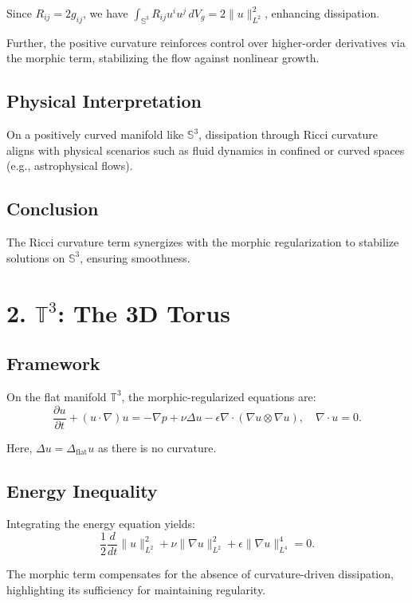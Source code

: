 \documentclass[12pt]{article}
\begin{document}
Since \( R_{ij} = 2g_{ij} \), we have \( \int_{\mathbb{S}^3} R_{ij} u^i u^j \, dV_g = 2 \| u \|_{L^2}^2 \), enhancing dissipation.

Further, the positive curvature reinforces control over higher-order derivatives via the morphic term, stabilizing the flow against nonlinear growth.

\subsection*{Physical Interpretation}
On a positively curved manifold like \( \mathbb{S}^3 \), dissipation through Ricci curvature aligns with physical scenarios such as fluid dynamics in confined or curved spaces (e.g., astrophysical flows).

\subsection*{Conclusion}
The Ricci curvature term synergizes with the morphic regularization to stabilize solutions on \( \mathbb{S}^3 \), ensuring smoothness.

\section*{2. \( \mathbb{T}^3 \): The 3D Torus}

\subsection*{Framework}
On the flat manifold \( \mathbb{T}^3 \), the morphic-regularized equations are:
\begin{equation}
\frac{\partial u}{\partial t} + (u \cdot \nabla)u = -\nabla p + \nu \Delta u - \epsilon \nabla \cdot (\nabla u \otimes \nabla u), \quad \nabla \cdot u = 0.
\end{equation}

Here, \( \Delta u = \Delta_{\text{flat}} u \) as there is no curvature.

\subsection*{Energy Inequality}
Integrating the energy equation yields:
\begin{equation}
\frac{1}{2} \frac{d}{dt} \| u \|_{L^2}^2 + \nu \| \nabla u \|_{L^2}^2 + \epsilon \| \nabla u \|_{L^4}^4 = 0.
\end{equation}

The morphic term compensates for the absence of curvature-driven dissipation, highlighting its sufficiency for maintaining regularity.
\end{document}
